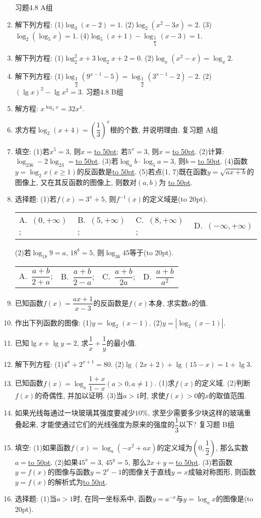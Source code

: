 \documentclass[10pt,a4paper]{article}
\newcommand{\blank}[1]{\underline{\hbox to #1pt{}}}
\newcommand{\bracket}[1]{(\hbox to #1pt{})}
\newcommand{\fourch}[4]{\par\begin{tabular}{p{.23\textwidth}p{.23\textwidth}p{.23\textwidth}p{.23\textwidth}}
A.~#1 &B.~#2& C.~#3& D.~#4
\end{tabular}}
\begin{document}
\begin{enumerate}[1.]
习题4.8  A组
\item 解下列方程:
(1)$\log _3(x-2)=1$.					(2)$\log _2(x^2-3x)=2$.
(3)$\log _2(\log _5x)=1$.				(4)$\log _5(x+1)-\log _{\dfrac 15}(x-3)=1$.
\item 解下列方程:
(1)$\log _2^2x+3\log _2x+2=0$.			(2)$\log _x(x^2-x)=\log _x2$.
\item 解下列方程:
(1)$\log _{\dfrac 12}(9^{x-1}-5)=\log _{\dfrac 12}(3^{x-1}-2)-2$.	(2)$(\lg x)^2-\lg x^2=3$.
习题4.8  B组
\item 解方程: $x^{\log _2x}=32x^4$.
\item 求方程$\log _2(x+4)=(\dfrac 13)^x$根的个数, 并说明理由.
复习题
A组
\item 填空:
(1)若$x^5=3$, 则$x=$\blank{50}; 若$5^x=3$, 则$x=$\blank{50}.
(2)计算: $\log _236-2\log _23=$\blank{50}.
(3)若$\log _ab\cdot \log _5a=3$, 则$b=$\blank{50}.
(4)函数$y=\log _2x(x\ge 1)$的反函数是\blank{50}.
(5)若点(1, 7)既在函数$y=\sqrt {ax+b}$的图像上, 又在其反函数的图像上, 则数对$(a,b)$为
\blank{50}.
\item 选择题:
(1)若$f(x)=3^x+5$, 则$f^{-1}(x)$的定义域是\bracket{20}.
\fourch{$(0,+\infty)$;}{$(5,+\infty)$;}{$(8,+\infty)$;}{$(-\infty ,+\infty)$}
(2)若$\log _{18}9=a$, $18^b=5$, 则$\log _{36}45$等于\bracket{20}.
\fourch{$\dfrac{a+b}{2+a}$;}{$\dfrac{a+b}{2-a}$;}{$\dfrac{a+b}{2a}$;}{$\dfrac{a+b}{a^2}$}
\item 已知函数$f(x)=\dfrac{ax+1}{x-3}$的反函数是$f(x)$本身, 求实数$a$的值.
\item 作出下列函数的图像:
(1)$y=\log _2(x-1)$.					(2)$y=|\log _2(x-1)|$.
\item 已知$\lg x+\lg y=2$, 求$\dfrac 1x+\dfrac 1y$的最小值.
\item 解下列方程:
(1)$4^x+2^{x+1}=80$.					(2)$\lg (2x+2)+\lg (15-x)=1+\lg 3$.
\item 已知函数$f(x)=\log _a\dfrac{1+x}{1-x}(a>0,a\ne 1)$.
(1)求$f(x)$的定义域.
(2)判断$f(x)$的奇偶性, 并加以证明.
(3)当$a>1$时, 求使$f(x)>0$的$x$的取值范围.
\item 如果光线每通过一块玻璃其强度要减少$10\%$, 求至少需要多少块这样的玻璃重叠起来, 才能使通过它们的光线强度为原来的强度的$\dfrac 13$以下?
复习题
B组
\item 填空:
(1)如果函数$f(x)=\log _a(-x^2+ax)$的定义域为$(0,\dfrac 12)$, 那么实数$a=$\blank{50}.
(2)如果$45^x=3$, $45^y=5$, 那么$2x+y=$\blank{50}.
(3)若函数$y=f(x)$的图像与函数$y=2^x-1$的图像关于直线$y=x$成轴对称图形, 则函数$y=f(x)$的解析式为\blank{50}.
\item 选择题:
(1)当$a>1$时, 在同一坐标系中, 函数$y=a^{-x}$与$y=\log _ax$的图像是\bracket{20}.

\end{enumerate}
\end{document}
